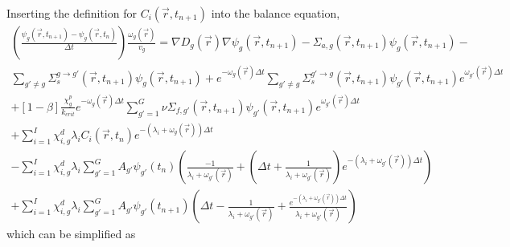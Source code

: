 \documentclass[12pt]{report}
\begin{document}
	Inserting the definition for $C_i(\vec{r},t_{n+1})$ into the balance equation,
	\begin{eqnarray}
	\left(\frac{\psi_g(\vec{r},t_{n+1}) - \psi_g(\vec{r},t_{n})}{\Delta t} \right) \frac{\omega_g(\vec{r})}{v_g}  = \nabla D_g(\vec{r}) \nabla \psi_g(\vec{r},t_{n+1}) - \Sigma_{a,g}(\vec{r},t_{n+1}) \psi_g(\vec{r},t_{n+1}) -  \nonumber \\ \sum_{g'\neq g} \Sigma_{s}^{g\rightarrow g'} (\vec{r},t_{n+1}) \psi_g(\vec{r},t_{n+1}) + e^{-\omega_g(\vec{r}) \Delta t} \sum_{g' \neq g} \Sigma_{s}^{g'\rightarrow g} (\vec{r},t_{n+1}) \psi_{g'}(\vec{r},t_{n+1}) e^{\omega_{g'}(\vec{r}) \Delta t} \nonumber \\
	+ \left[ 1- \beta \right] \frac{\chi_g^p}{k_{crit}} e^{-\omega_g(\vec{r}) \Delta t} \sum_{g'=1}^{G} \nu \Sigma_{f,g'}(\vec{r},t_{n+1}) \psi_{g'}(\vec{r},t_{n+1}) e^{\omega_{g'}(\vec{r}) \Delta t} \nonumber \\ +  \sum_{i=1}^{I} \chi_{i,g}^d \lambda_i C_i(\vec{r},t_{n}) e^{-\left(\lambda_i + \omega_g(\vec{r})\right) \Delta t} \nonumber \\
	- \sum_{i=1}^{I} \chi_{i,g}^d \lambda_i \sum_{g'=1}^{G} A_{g'} \psi_{g'}(t_n) \left( \frac{-1}{\lambda_i + \omega_{g'}(\vec{r})} + \left(\Delta t + \frac{1}{\lambda_i + \omega_{g'}(\vec{r})} \right)e^{-\left(\lambda_i + \omega_{g'}(\vec{r}) \right) \Delta t} \right) \nonumber \\
	+ \sum_{i=1}^{I} \chi_{i,g}^d \lambda_i \sum_{g'=1}^{G} A_{g'} \psi_{g'}(t_{n+1}) \left( \Delta t - \frac{1}{\lambda_i + \omega_{g'}(\vec{r})} + \frac{e^{-\left( \lambda_i + \omega_{g'}(\vec{r}) \right) \Delta t}}{\lambda_i + \omega_{g'}(\vec{r})} \right)
	\nonumber
	\end{eqnarray}
	which can be simplified as
\end{document}
